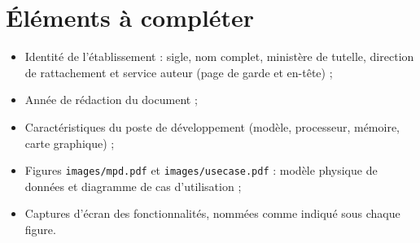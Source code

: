 \section{Éléments à compléter}
\begin{itemize}
    \item Identité de l'établissement : sigle, nom complet, ministère de tutelle, direction de
          rattachement et service auteur (page de garde et en-tête) ;
    \item Année de rédaction du document ;
    \item Caractéristiques du poste de développement (modèle, processeur, mémoire, carte graphique) ;
    \item Figures \texttt{images/mpd.pdf} et \texttt{images/usecase.pdf} : modèle physique de données
          et diagramme de cas d'utilisation ;
    \item Captures d'écran des fonctionnalités, nommées comme indiqué sous chaque figure.
\end{itemize}
